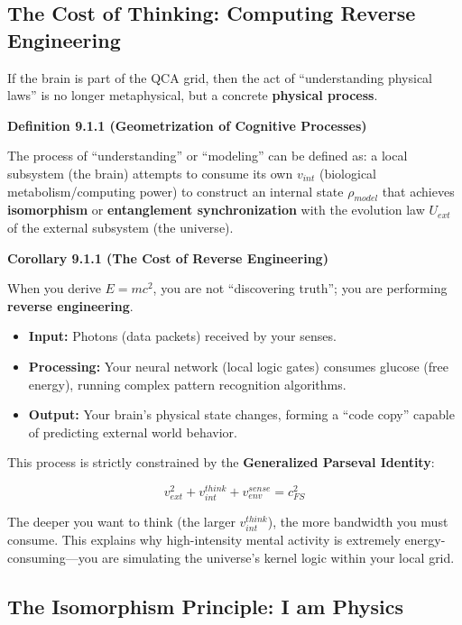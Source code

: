 \subsection{The Cost of Thinking: Computing Reverse Engineering}

If the brain is part of the QCA grid, then the act of ``understanding physical laws'' is no longer metaphysical, but a concrete \textbf{physical process}.

\textbf{Definition 9.1.1 (Geometrization of Cognitive Processes)}

The process of ``understanding'' or ``modeling'' can be defined as: a local subsystem (the brain) attempts to consume its own \textbf{$v_{int}$} (biological metabolism/computing power) to construct an internal state \textbf{$\rho_{model}$} that achieves \textbf{isomorphism} or \textbf{entanglement synchronization} with the evolution law \textbf{$U_{ext}$} of the external subsystem (the universe).

\textbf{Corollary 9.1.1 (The Cost of Reverse Engineering)}

When you derive $E=mc^2$, you are not ``discovering truth''; you are performing \textbf{reverse engineering}.

\begin{itemize}
\item \textbf{Input:} Photons (data packets) received by your senses.

\item \textbf{Processing:} Your neural network (local logic gates) consumes glucose (free energy), running complex pattern recognition algorithms.

\item \textbf{Output:} Your brain's physical state changes, forming a ``code copy'' capable of predicting external world behavior.
\end{itemize}

This process is strictly constrained by the \textbf{Generalized Parseval Identity}:

$$v_{ext}^2 + v_{int}^{think} + v_{env}^{sense} = c_{FS}^2$$

The deeper you want to think (the larger $v_{int}^{think}$), the more bandwidth you must consume. This explains why high-intensity mental activity is extremely energy-consuming---you are simulating the universe's kernel logic within your local grid.

\subsection{The Isomorphism Principle: I am Physics}

